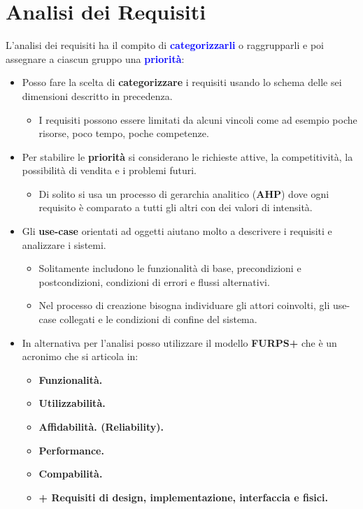 \section{Analisi dei Requisiti}
L'analisi dei requisiti ha il compito di \textbf{\textcolor{blue}{categorizzarli}} o raggrupparli e poi assegnare a ciascun gruppo una \textbf{\textcolor{blue}{priorità}}:
\begin{itemize}
    \item Posso fare la scelta di \textbf{categorizzare} i requisiti usando lo schema delle sei dimensioni descritto in precedenza.
    \begin{itemize}
        \item I requisiti possono essere limitati da alcuni vincoli come ad esempio poche risorse, poco tempo, poche competenze.
    \end{itemize}
    \item Per stabilire le \textbf{priorità} si considerano le richieste attive, la competitività, la possibilità di vendita e i problemi futuri.
    \begin{itemize}
        \item Di solito si usa un processo di gerarchia analitico (\textbf{AHP}) dove ogni requisito è comparato a tutti gli altri con dei valori di intensità.
    \end{itemize}
    \item Gli \textbf{use-case} orientati ad oggetti aiutano molto a descrivere i requisiti e analizzare i sistemi.
    \begin{itemize}
        \item Solitamente includono le funzionalità di base, precondizioni e postcondizioni, condizioni di errori e flussi alternativi.
        \item Nel processo di creazione bisogna individuare gli attori coinvolti, gli use-case collegati e le condizioni di confine del sistema.
    \end{itemize}
    \item In alternativa per l'analisi posso utilizzare il modello \textbf{FURPS+} che è un acronimo che si articola in:
    \begin{itemize}
        \item \textbf{Funzionalità.}
        \item \textbf{Utilizzabilità.}
        \item \textbf{Affidabilità. (Reliability).}
        \item \textbf{Performance.}
        \item \textbf{Compabilità.}
        \item \textbf{+ Requisiti di design, implementazione, interfaccia e fisici.}
    \end{itemize}
\end{itemize}

